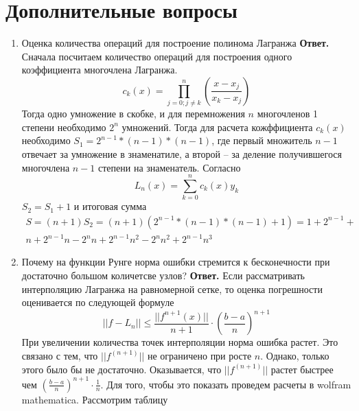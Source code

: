 \documentclass{article}
\begin{document}
    \section{Дополнительные вопросы}
    \begin{enumerate}
        \item Оценка количества операций для построение полинома Лагранжа
        \newline
        {\bfseries Ответ. } 
        Сначала посчитаем количество операций для построения одного коэффициента многочлена Лагранжа.
        \begin{equation*}
            c_k(x) = \prod_{j=0;j\neq k}^{n} \left(\dfrac{x-x_j}{x_k - x_j}\right)
        \end{equation*}
        Тогда одно умножение в скобке, и для перемножения $n$ многочленов 1 степени необходимо $2^n$ умножений. Тогда для 
        расчета кожффициента $ c_k(x)$ необходимо $S_1 = 2^{n-1} * (n-1) * (n-1)$, где 
        первый множитель $n-1$ отвечает за умножение в знаменатиле, а второй -- за деление получившегося многочлена $n-1$ степени 
        на знаменатель. 
        Согласно
        \begin{equation*}
            L_n(x) = \sum_{k=0}^{n} c_k(x)  y_k
        \end{equation*}
        $S_2 = S_1 + 1$ и итоговая сумма 
        \begin{gather*}
            S = (n+1)S_2 = (n+1)( 2^{n-1} * (n-1) * (n-1) + 1) = 1 + 2^{n-1} +\\ 
            n + 2^{n-1} n - 2^n n + 2^{n-1} n^2 - 
            2^n n^2 + 2^{n-1} n^3
        \end{gather*}
        \item Почему на функции Рунге норма ошибки стремится к бесконечности при достаточно большом количетсве узлов?
        \newline
        {\bfseries Ответ. } 
        Если рассматривать интерполяцию Лагранжа на равномерной сетке, то оценка погрешности оценивается по следующей формуле
        \[
        ||f-L_n|| \le \frac{||f^{n+1}(x)||}{n+1} \cdot (\frac{b-a}{n})^{n+1}
        \]
        При увеличении количества точек интерполяции норма ошибка растет. Это связано с тем, что $||f^(n+1)||$ не ограничено при росте $n$. Однако, только этого было бы не достаточно. Оказывается, что $||f^{(n+1)}||$ растет быстрее чем $(\frac{b-a}{n})^{n+1} \cdot \frac{1}{n}$. Для того, чтобы это показать проведем расчеты в wolfram mathematica. Рассмотрим таблицу
        \begin{table}[H]

\end{table}
\end{enumerate}
\end{document}

